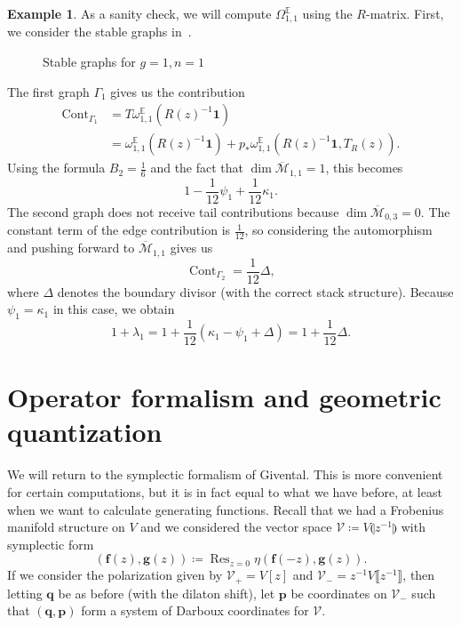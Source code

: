 \documentclass{amsart}
\theoremstyle{definition}
\newtheorem{exm}[thm]{Example}
\theoremstyle{remark}
\theoremstyle{plain}
\theoremstyle{definition}
\theoremstyle{remark}
\newcommand{\E}{\mathbb{E}}
\newcommand{\Mbar}{\overline{\mathcal{M}}}
\newcommand{\mc}[1]{\mathcal{#1}}
\newcommand{\mbf}[1]{\mathbf{#1}}
\newcommand{\bq}{\mbf{q}}
\newcommand{\bp}{\mbf{p}}
\newcommand{\on}[1]{\operatorname{#1}}
\newcommand{\1}{\mathbf{1}}
\newcommand{\2}{\mathbf{2}}
\newcommand{\3}{\mathbf{3}}
\newcommand{\ps}[1]{\llbracket #1 \rrbracket}
\newcommand{\ls}[1]{\llparenthesis #1 \rrparenthesis}
\DeclareMathOperator{\Cont}{Cont}
\begin{document}
\begin{exm}
    As a sanity check, we will compute $\Omega_{1,1}^{\E}$ using the $R$-matrix. First, we consider the stable graphs in~.
    \begin{figure}[htpb]
    \begin{center}
    \end{center}
    \caption{Stable graphs for $g=1, n=1$}%
    \label{fig:03graphloop}
    \end{figure}
    The first graph $\Gamma_1$ gives us the contribution
    \begin{align*}
        \Cont_{\Gamma_1} &= T\omega_{1,1}^{\E}(R(z)^{-1}\1) \\
        &= \omega_{1,1}^{\E}(R(z)^{-1}\1) + p_* \omega_{1,1}^{\E}(R(z)^{-1}\1, T_R(z)).
    \end{align*}
    Using the formula $B_2 = \frac{1}{6}$ and the fact that $\dim \Mbar_{1,1} = 1$, this becomes
    \[ 1 - \frac{1}{12}\psi_1 + \frac{1}{12} \kappa_1. \]
    The second graph does not receive tail contributions because $\dim \Mbar_{0,3} = 0$. The constant term of the edge contribution is $\frac{1}{12}$, so considering the automorphism and pushing forward to $\Mbar_{1,1}$ gives us
    \[ \Cont_{\Gamma_2} = \frac{1}{12} \Delta, \]
    where $\Delta$ denotes the boundary divisor (with the correct stack structure). Because $\psi_1 = \kappa_1$ in this case, we obtain
    \[ 1+\lambda_1 = 1 + \frac{1}{12}(\kappa_1 - \psi_1 + \Delta) = 1 + \frac{1}{12} \Delta. \]
\end{exm}

\section{Operator formalism and geometric quantization}%
\label{sec:Operator formalism and geometric quantization}

We will return to the symplectic formalism of Givental. This is more convenient for certain computations, but it is in fact equal to what we have before, at least when we want to calculate generating functions. Recall that we had a Frobenius manifold structure on $V$ and we considered the vector space $\mc{V}\coloneqq V\ls{z^{-1}}$ with symplectic form
\[ (\mbf{f}(z), \mbf{g}(z)) \coloneqq \on{Res}_{z=0} \eta(\mbf{f}(-z), \mbf{g}(z)). \]
If we consider the polarization given by $\mc{V}_+ = V[z]$ and $\mc{V}_- = z^{-1}V\ps{z^{-1}}$, then letting $\bq$ be as before (with the dilaton shift), let $\bp$ be coordinates on $\mc{V}_-$ such that $(\bq, \bp)$ form a system of Darboux coordinates for $\mc{V}$.
\end{document}
